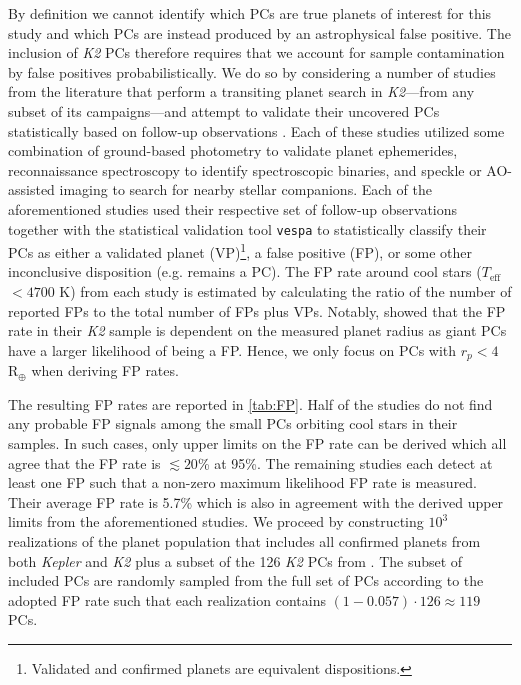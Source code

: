 \documentclass[twocolumn]{emulateapj}
\newcommand{\kepler}[1]{\emph{Kepler}#1}
\newcommand{\ktwo}[1]{\emph{K2}#1}
\newcommand{\teff}[1]{$T_{\text{eff}}$#1}
\begin{document}
By definition we cannot identify which PCs are true planets of interest for this study and
which PCs are instead produced by an astrophysical false positive. 
The inclusion of \ktwo{} PCs therefore requires that we account for sample contamination by false positives
probabilistically. We do so by considering
a number of studies from the literature that perform a transiting planet search in \ktwo{---}from any subset of its
campaigns---and attempt to validate their uncovered PCs statistically based on follow-up observations
\citep{montet15,crossfield16b,dressing17,hirano18,livingston18a,mayo18}. Each of these studies utilized some combination of
ground-based photometry to validate planet ephemerides, reconnaissance
spectroscopy to identify spectroscopic binaries, and speckle or AO-assisted imaging to search for nearby stellar companions.
Each of the aforementioned studies used their respective set of follow-up observations together with the
statistical validation tool \texttt{vespa} \citep{morton12,morton15} to statistically classify their PCs as either a validated
planet (VP)\footnote{Validated and confirmed planets are equivalent dispositions.},
a false positive (FP), or some other inconclusive disposition (e.g. remains a PC). The FP rate around cool
stars (\teff{} $< 4700$ K) from each study is estimated by calculating the ratio of the number of reported FPs to
the total number of FPs plus VPs. Notably, \cite{crossfield16b} showed that the FP rate in their \ktwo{} sample is dependent
on the measured planet radius as giant PCs have a larger likelihood of
being a FP. Hence, we only focus on PCs with $r_p<4$ R$_{\oplus}$ when deriving FP rates.

The resulting FP rates are reported in \autoref{tab:FP}. Half of the studies do not find any probable
FP signals among the small PCs orbiting cool stars in their samples. In such cases, only upper limits on the FP rate
can be derived which all agree that the FP rate is $\lesssim 20$\% at 95\%. The remaining studies
each detect at least one FP such that a non-zero maximum likelihood FP rate is measured. Their average FP rate is 5.7\%
which is also in agreement with the derived upper limits from the aforementioned studies.
We proceed by constructing $10^3$ realizations of the planet population
that includes all confirmed planets from both \kepler{} and \ktwo{} plus a subset of the 126 \ktwo{} PCs from
\cite{kruse19}. The subset of included PCs are randomly sampled from the full set of PCs
according to the adopted FP rate such that each realization contains $(1-0.057)\cdot 126 \approx 119$ PCs.
\end{document}
